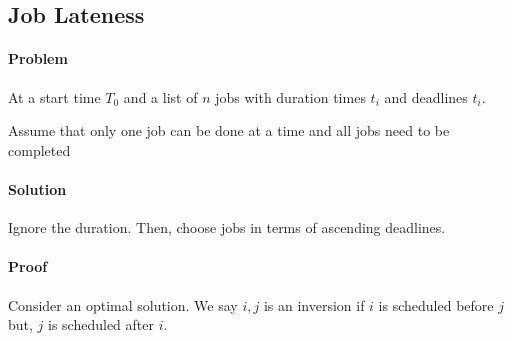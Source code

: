 


\subsection{Job Lateness}
\paragraph{Problem}
At a start time \(T_0\) and a list of \(n\) jobs with duration times
\(t_i\) and deadlines \(t_i\).

Assume that only one job can be done at a time and all jobs need to
be completed

\paragraph{Solution}
Ignore the duration. Then, choose jobs in terms of ascending deadlines.

\paragraph{Proof}
Consider an optimal solution.
We say \(i, j\) is an inversion if \(i\) is scheduled before
\(j\) but, \(j\) is scheduled after \(i\).

